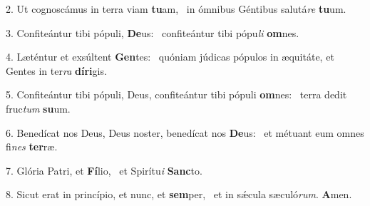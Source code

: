 2. Ut cognoscámus in terra viam \textbf{tu}am, \ast\  in ómnibus Géntibus salutá\textit{re} \textbf{tu}um.\

3. Confiteántur tibi pópuli, \textbf{De}us: \ast\  confiteántur tibi pópu\textit{li} \textbf{om}nes.\

4. Læténtur et exsúltent \textbf{Gen}tes: \ast\  quóniam júdicas pópulos in æquitáte, et Gentes in ter\textit{ra} \textbf{dí}\textbf{ri}gis.\

5. Confiteántur tibi pópuli, Deus, confiteántur tibi pópuli \textbf{om}nes: \ast\  terra dedit fruc\textit{tum} \textbf{su}um.\

6. Benedícat nos Deus, Deus noster, benedícat nos \textbf{De}us: \ast\  et métuant eum omnes fi\textit{nes} \textbf{ter}ræ.\

7. Glória Patri, et \textbf{Fí}lio, \ast\  et Spirítu\textit{i} \textbf{Sanc}to.\

8. Sicut erat in princípio, et nunc, et \textbf{sem}per, \ast\  et in sǽcula sæculó\textit{rum}. \textbf{A}men.\


